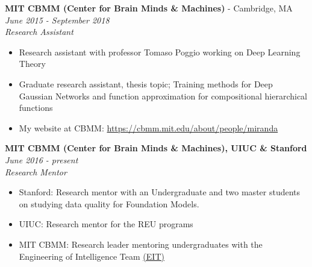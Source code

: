 \documentclass{article}
\newenvironment{changemargin}[2]{%
  \begin{list}{}{%
    \setlength{\topsep}{0pt}%
    \setlength{\leftmargin}{#1}%
    \setlength{\rightmargin}{#2}%
    \setlength{\listparindent}{\parindent}%
    \setlength{\itemindent}{\parindent}%
    \setlength{\parsep}{\parskip}%
  }%
  \item[]}{\end{list}
}
\newenvironment{body} {
	\vspace*{-16pt}
	\begin{changemargin}{-0.25in}{-0.5in}
  }	
	{\end{changemargin}
}
\begin{document}
\begin{body}
	\textbf{MIT CBMM (Center for Brain Minds \& Machines)} - Cambridge, MA \hfill \emph{June 2015 - September 2018}\\
	\emph{Research Assistant}\\
	\vspace*{-3pt}
	\begin{itemize} \itemsep -2pt  %
        \item Research assistant with professor Tomaso Poggio working on Deep Learning Theory
        \item Graduate research assistant, thesis topic; Training methods for Deep Gaussian Networks and function approximation for compositional hierarchical functions
        \item My website at CBMM: \href{https://cbmm.mit.edu/about/people/miranda}{https://cbmm.mit.edu/about/people/miranda}
	\end{itemize}
	\vspace{5 pt}
    
	\textbf{MIT CBMM (Center for Brain Minds \& Machines), UIUC \& Stanford} \hfill \emph{June 2016 - present}\\
	\emph{Research Mentor}\\
	\vspace*{-3pt}
	\begin{itemize} \itemsep -2pt  %
        \item Stanford: Research mentor with an Undergraduate and two master students on studying data quality for Foundation Models.
        \item UIUC: Research mentor for the REU programs
        \item MIT CBMM: Research leader mentoring undergraduates with the Engineering of Intelligence Team \href{https://cbmm.mit.edu/eit/people}{(EIT)}
	\end{itemize}
	\vspace{5 pt}
    
    
\end{body}
\end{document}
